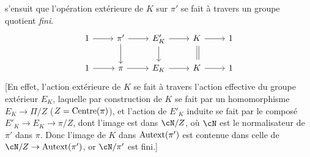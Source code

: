 s'ensuit que l'opération extérieure de $K$ sur $\pi'$ se
fait à travers un groupe quotient {\it fini}.
\[\begin{tikzcd}
	1 & {\pi'} & {E'_K} & K & 1 \\
	1 & \pi & {E_K} & K & 1
	\arrow[from=1-1, to=1-2]
	\arrow[from=1-2, to=1-3]
	\arrow[from=1-3, to=1-4]
	\arrow[from=1-4, to=1-5]
	\arrow[from=2-1, to=2-2]
	\arrow[from=2-2, to=2-3]
	\arrow[from=2-3, to=2-4]
	\arrow[from=2-4, to=2-5]
	\arrow[from=1-2, to=2-2]
	\arrow[from=1-3, to=2-3]
	\arrow[shift left=1, shorten <=2pt, shorten >=2pt, no head, from=1-4, to=2-4]
	\arrow[shorten <=2pt, shorten >=2pt, no head, from=1-4, to=2-4]
\end{tikzcd}\]
[En effet, l'action extérieure de $K$ se fait à travers
l'action effective du groupe extérieur $E_K$,
laquelle par construction de $K$ se fait par un homomorphisme
$E_K\to\Pi/Z$ ($Z={\rm Centre}
(\pi)$), et l'action de $E'_K$ induite se fait par le
composé $E'_K\to E_K\to
\pi/Z$, dont l'image est dans $\cN/Z$, où
$\cN$ est le normalisateur de $\pi'$ dans $\pi$.  Donc
l'image de $K$ dans ${\rm Autext}(\pi')$ est contenue dans
celle de $\cN/Z\to{\rm Autext}(\pi')$,
or $\cN/\pi'$ est fini.]

